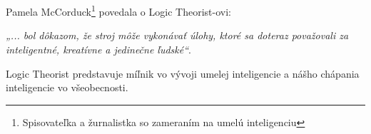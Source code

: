 \section*{}
\vspace{-20pt}
Pamela McCorduck\footnote{Spisovateľka a žurnalistka so zameraním na umelú inteligenciu} povedala o Logic Theorist-ovi: 

\textit{„... bol dôkazom, že stroj môže vykonávať úlohy, ktoré sa doteraz považovali za inteligentné, kreatívne a jedinečne ľudské“}\cite{Corduck}.


Logic Theorist predstavuje míľnik vo vývoji umelej inteligencie a nášho chápania inteligencie vo všeobecnosti.